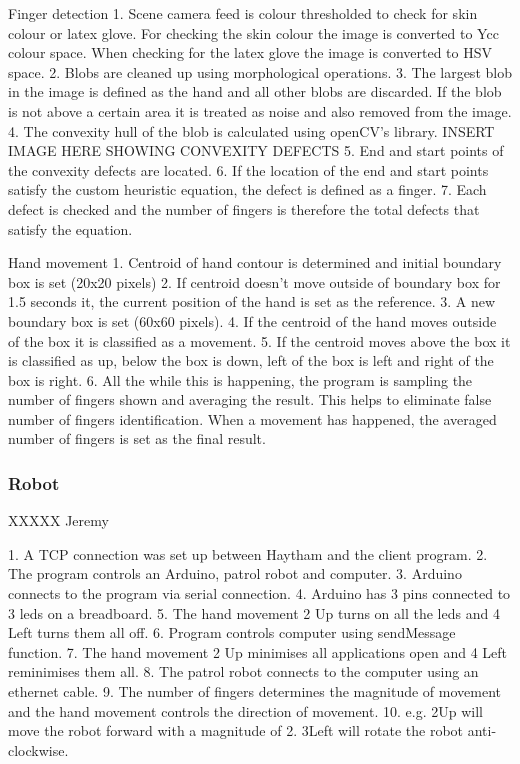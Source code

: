 \documentclass[jou,a4paper,notxfonts]{apa}
\begin{document}
Finger detection
1. Scene camera feed is colour thresholded to check for skin colour or latex glove. For checking the skin colour the image is 
converted to Ycc colour space. When checking for the latex glove the image is converted to HSV space.
2. Blobs are cleaned up using morphological operations.
3. The largest blob in the image is defined as the hand and all other blobs are discarded. If the blob is not above a certain area
it is treated as noise and also removed from the image.
4. The convexity hull of the blob is calculated using openCV's library.
INSERT IMAGE HERE SHOWING CONVEXITY DEFECTS
5. End and start points of the convexity defects are located.
6. If the location of the end and start points satisfy the custom heuristic equation, the defect is defined as a finger.
7. Each defect is checked and the number of fingers is therefore the total defects that satisfy the equation.

Hand movement
1. Centroid of hand contour is determined and initial boundary box is set (20x20 pixels)
2. If centroid doesn't move outside of boundary box for 1.5 seconds it, the current position of the hand is set as the reference.
3. A new boundary box is set (60x60 pixels).
4. If the centroid of the hand moves outside of the box it is classified as a movement.
5. If the centroid moves above the box it is classified as up, below the box is down, left of the box is left and right of the box is right.
6. All the while this is happening, the program is sampling the number of fingers shown and averaging the result. This helps to eliminate
false number of fingers identification. When a movement has happened, the averaged number of fingers is set as the final result.

\subsubsection{Robot}
XXXXX Jeremy


1. A TCP connection was set up between Haytham and the client program.
2. The program controls an Arduino, patrol robot and computer.
3. Arduino connects to the program via serial connection.
4. Arduino has 3 pins connected to 3 leds on a breadboard.
5. The hand movement 2 Up turns on all the leds and 4 Left turns them all off.
6. Program controls computer using sendMessage function.
7. The hand movement 2 Up minimises all applications open and 4 Left reminimises them all.
8. The patrol robot connects to the computer using an ethernet cable.
9. The number of fingers determines the magnitude of movement and the hand movement controls the direction of movement.
10. e.g. 2Up will move the robot forward with a magnitude of 2. 3Left will rotate the robot anti-clockwise.
\end{document}
